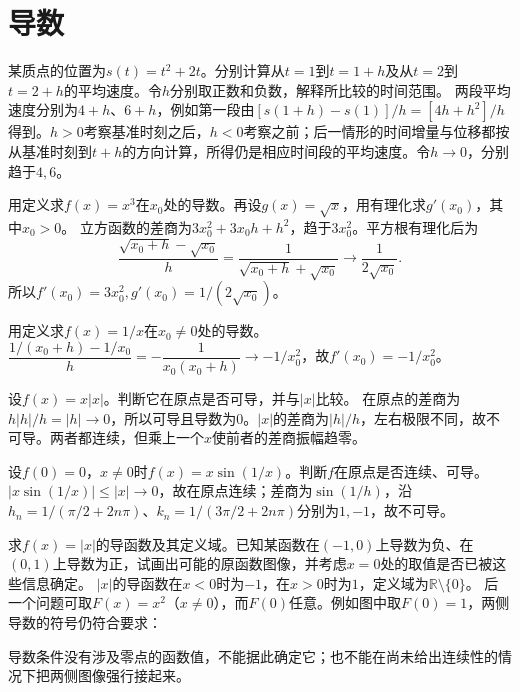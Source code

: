 \par\addvspace{12pt}

\section{导数}

某质点的位置为\(s(t)=t^2+2t\)。分别计算从\(t=1\)到\(t=1+h\)及从\(t=2\)到\(t=2+h\)的平均速度。令\(h\)分别取正数和负数，解释所比较的时间范围。
\solutionanswer
两段平均速度分别为\(4+h\)、\(6+h\)，例如第一段由\([s(1+h)-s(1)]/h=[4h+h^2]/h\)得到。\(h>0\)考察基准时刻之后，\(h<0\)考察之前；后一情形的时间增量与位移都按从基准时刻到\(t+h\)的方向计算，所得仍是相应时间段的平均速度。令\(h\to0\)，分别趋于\(4,6\)。


用定义求\(f(x)=x^3\)在\(x_0\)处的导数。再设\(g(x)=\sqrt{x}\)，用有理化求\(g'(x_0)\)，其中\(x_0>0\)。
\solutionanswer
立方函数的差商为\(3x_0^2+3x_0h+h^2\)，趋于\(3x_0^2\)。平方根有理化后为
\[
 \frac{\sqrt{x_0+h}-\sqrt{x_0}}h
 =\frac1{\sqrt{x_0+h}+\sqrt{x_0}}\longrightarrow\frac1{2\sqrt{x_0}}.
\]
所以\(f'(x_0)=3x_0^2,g'(x_0)=1/(2\sqrt{x_0})\)。


用定义求\(f(x)=1/x\)在\(x_0\ne0\)处的导数。
\solutionanswer
\(\dfrac{1/(x_0+h)-1/x_0}{h}=-\dfrac1{x_0(x_0+h)}\to-1/x_0^2\)，故\(f'(x_0)=-1/x_0^2\)。


设\(f(x)=x|x|\)。判断它在原点是否可导，并与\(|x|\)比较。
\solutionanswer
在原点的差商为\(h|h|/h=|h|\to0\)，所以可导且导数为\(0\)。\(|x|\)的差商为\(|h|/h\)，左右极限不同，故不可导。两者都连续，但乘上一个\(x\)使前者的差商振幅趋零。


设\(f(0)=0\)，\(x\ne0\)时\(f(x)=x\sin(1/x)\)。判断\(f\)在原点是否连续、可导。
\solutionanswer
\(|x\sin(1/x)|\le|x|\to0\)，故在原点连续；差商为\(\sin(1/h)\)，沿\(h_n=1/(\pi/2+2n\pi)\)、\(k_n=1/(3\pi/2+2n\pi)\)分别为\(1,-1\)，故不可导。


求\(f(x)=|x|\)的导函数及其定义域。已知某函数在\((-1,0)\)上导数为负、在\((0,1)\)上导数为正，试画出可能的原函数图像，并考虑\(x=0\)处的取值是否已被这些信息确定。
\solutionanswer
\(|x|\)的导函数在\(x<0\)时为\(-1\)，在\(x>0\)时为\(1\)，定义域为\(\mathbb R\setminus\{0\}\)。
后一个问题可取\(F(x)=x^2\)（\(x\ne0\)），而\(F(0)\)任意。例如图中取\(F(0)=1\)，两侧导数的符号仍符合要求：
\begin{center}
\end{center}
导数条件没有涉及零点的函数值，不能据此确定它；也不能在尚未给出连续性的情况下把两侧图像强行接起来。


